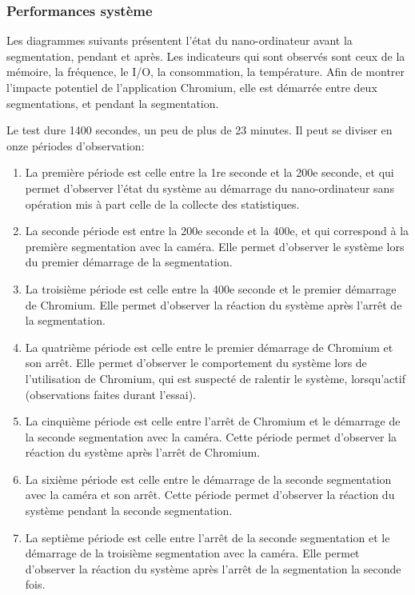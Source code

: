 \subsubsection{Performances système}
\par Les diagrammes suivants présentent l'état du nano-ordinateur avant la segmentation, pendant et après. Les indicateurs qui sont observés sont ceux de la mémoire, la fréquence, le I/O, la consommation, la température. Afin de montrer l'impacte potentiel de l'application Chromium, elle est démarrée entre deux segmentations, et pendant la segmentation. 
\par Le test dure 1400 secondes, un peu de plus de 23 minutes. Il peut se diviser en onze périodes d'observation: 
\begin{enumerate}
   \item La première période est celle entre la 1re seconde et la 200e seconde, et qui permet d'observer l'état du système au démarrage du nano-ordinateur sans opération mis à part celle de la collecte des statistiques. 
   \item La seconde période est entre la 200e seconde et la 400e, et qui correspond à la première segmentation avec la caméra. Elle permet d'observer le système lors du premier démarrage de la segmentation. 
   \item La troisième période est celle entre la 400e seconde et le premier démarrage de Chromium. Elle permet d'observer la réaction du système après l'arrêt de la segmentation. 
   \item La quatrième période est celle entre le premier démarrage de Chromium et son arrêt. Elle permet d'observer le comportement du système lors de l'utilisation de Chromium, qui est suspecté de ralentir le système, lorsqu'actif (observations faites durant l'essai).
   \item La cinquième période est celle entre l'arrêt de Chromium et le démarrage de la seconde segmentation avec la caméra. Cette période permet d'observer la réaction du système après l'arrêt de Chromium. 
   \item La sixième période est celle entre le démarrage de la seconde segmentation avec la caméra et son arrêt. Cette période permet d'observer la réaction du système pendant la seconde segmentation. 
   \item La septième période est celle entre l'arrêt de la seconde segmentation et le démarrage de la troisième segmentation avec la caméra. Elle permet d'observer la réaction du système après l'arrêt de la segmentation la seconde fois. 

\end{enumerate}
